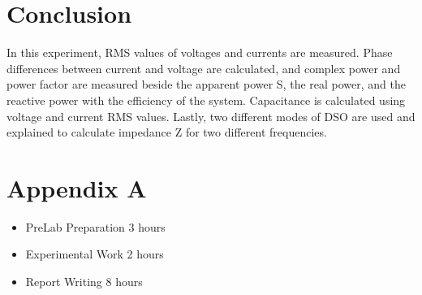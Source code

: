 \documentclass[letterpaper,12pt]{article}
\begin{document}
\section{Conclusion}
In this experiment, RMS values of voltages and currents are measured. Phase differences between current and voltage are calculated, and complex power and power factor are measured beside the apparent power S, the real power, and the reactive power with the efficiency of the system. Capacitance is calculated using voltage and current RMS values. Lastly, two different modes of DSO are used and explained to calculate impedance Z for two different frequencies.


\section*{Appendix A}
\begin{itemize}
    \item PreLab Preparation 3 hours
    \item Experimental Work 2  hours
    \item Report Writing 8 hours
\end{itemize}
\end{document}
